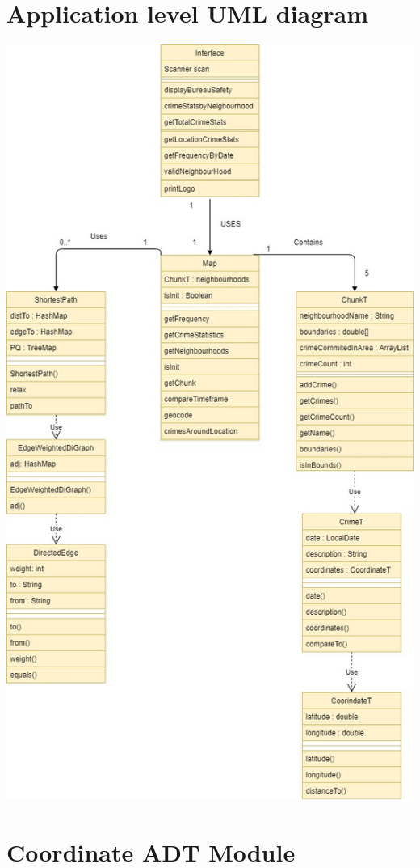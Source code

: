 \documentclass[12pt]{article}
\begin{document}
\newpage

\section* {Application level UML diagram}

\includegraphics[scale = 0.5]{UML.jpg}

\section* {Coordinate ADT Module}
\end{document}
